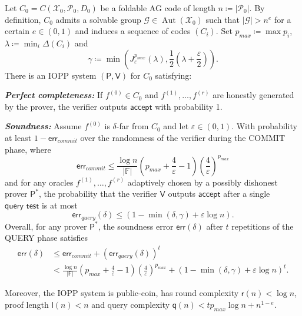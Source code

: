 \documentclass[a4paper,USenglish,autoref]{lipics-v2021}
\renewcommand\epsilon{\varepsilon}
\newcommand\F{\mathbb{F}}
\DeclareMathOperator{\Aut}{Aut}
\newcommand\prover{\mathsf{P}}
\newcommand\verifier{\mathsf{V}}
\newcommand{\size}[1]{\left|#1\right|}
\newcommand\calX{\mathcal{X}}
\newcommand\calP{\mathcal{P}}
\newcommand\calG{\mathcal{G}}
\newcommand{\err}{\textsf{err}}
\newcommand\mydef{\coloneqq}
\begin{document}
\begin{theorem}\label{thm:properties}
	Let ${C_0 = C(\calX_0, \calP_0, D_0)}$ be a foldable AG code of length $n \mydef \size{\calP_0}$. By definition, $C_0$ admits a solvable group $\calG \in \Aut(\calX_0)$ such that $\size{\calG} > n^e$ for a certain $e \in (0,1)$ and induces a sequence of codes $(C_i)$. Set $p_{max}\mydef \max p_i$, ${\lambda \mydef \min_i \Delta(C_i)}$ and \[\gamma \mydef \min\left(J_{\epsilon}^{p_{max}}(\lambda), \frac{1}{2}(\lambda + \frac{\epsilon}{2})\right).\]
	There is an IOPP system $(\prover, \verifier)$ for $C_0$ satisfying:
	\begin{description}
		\item \textbf{\emph{Perfect completeness:}} If $f^{(0)} \in C_0$ and $f^{(1)}, \dots, f^{(r)}$ are honestly generated by the prover, the verifier outputs $\mathsf{accept}$ with probability 1.
		\item \emph{\textbf{Soundness:}} Assume $f^{(0)}$ is $\delta$-far from $C_0$ and let $\epsilon \in (0,1)$. With probability  at least $1 - \err_{commit}$ over the randomness of the verifier during the \textsf{COMMIT} phase, where 
		\[
		\err_{commit} \leq \frac{\log n}{\size \F}\left(p_{max} + \frac{4}{\epsilon} - 1\right)\left(\frac{4}{\epsilon}\right)^{p_{max}}
		\] 
		and for any oracles $f^{(1)}, \ldots, f^{(r)}$ adaptively chosen by a possibly dishonest prover $\prover^*$, the probability that the verifier $\verifier$ outputs $\mathsf{accept}$ after a single $\textsf{query test}$ is at most
		\[
		\err_{query}(\delta) \leq (1 - \min(\delta, \gamma) + \epsilon \log n).
		\]        
		Overall, for any prover $\prover^*$, the soundness error
		$\err(\delta)$ after $t$ repetitions of the \textsf{QUERY} phase satisfies
		\begin{align*}
			\err(\delta) &\leq \err_{commit} + \left(\err_{query}(\delta)\right)^t\\
			&< \frac{\log n}{\size \F}\left(p_{max} + \frac{4}{\epsilon} - 1\right)\left(\frac{4}{\epsilon}\right)^{p_{max}} + (1 - \min(\delta, \gamma) + \epsilon\log n)^t.
		\end{align*}
	\end{description}
	
	Moreover, the IOPP system is public-coin, has round complexity $\mathsf{r}(n) < \log n$, proof length $\mathsf{l}(n) < n$ and query complexity ${\mathsf{q}(n) < t p_{max}\log n + n^{1 - e}}$.
\end{theorem}
\end{document}
